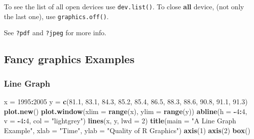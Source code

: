 \documentclass[]{book}
\newenvironment{Shaded}{\begin{snugshade}}{\end{snugshade}}
\newcommand{\KeywordTok}[1]{\textcolor[rgb]{0.13,0.29,0.53}{\textbf{#1}}}
\newcommand{\DataTypeTok}[1]{\textcolor[rgb]{0.13,0.29,0.53}{#1}}
\newcommand{\DecValTok}[1]{\textcolor[rgb]{0.00,0.00,0.81}{#1}}
\newcommand{\FloatTok}[1]{\textcolor[rgb]{0.00,0.00,0.81}{#1}}
\newcommand{\StringTok}[1]{\textcolor[rgb]{0.31,0.60,0.02}{#1}}
\newcommand{\CommentTok}[1]{\textcolor[rgb]{0.56,0.35,0.01}{\textit{#1}}}
\newcommand{\OperatorTok}[1]{\textcolor[rgb]{0.81,0.36,0.00}{\textbf{#1}}}
\newcommand{\NormalTok}[1]{#1}
\theoremstyle{definition}
\theoremstyle{definition}
\theoremstyle{definition}
\theoremstyle{remark}
\begin{document}
\begin{Shaded}
\end{Shaded}

To see the list of all open devices use \texttt{dev.list()}. To close
\textbf{all} device, (not only the last one), use
\texttt{graphics.off()}.

See \texttt{?pdf} and \texttt{?jpeg} for more info.

\subsection{Fancy graphics Examples}\label{fancy}

\subsubsection{Line Graph}\label{line-graph}

\begin{Shaded}
\begin{Highlighting}[]
\NormalTok{x =}\StringTok{ }\DecValTok{1995}\OperatorTok{:}\DecValTok{2005}
\NormalTok{y =}\StringTok{ }\KeywordTok{c}\NormalTok{(}\FloatTok{81.1}\NormalTok{, }\FloatTok{83.1}\NormalTok{, }\FloatTok{84.3}\NormalTok{, }\FloatTok{85.2}\NormalTok{, }\FloatTok{85.4}\NormalTok{, }\FloatTok{86.5}\NormalTok{, }\FloatTok{88.3}\NormalTok{, }\FloatTok{88.6}\NormalTok{, }\FloatTok{90.8}\NormalTok{, }\FloatTok{91.1}\NormalTok{, }\FloatTok{91.3}\NormalTok{)}
\KeywordTok{plot.new}\NormalTok{()}
\KeywordTok{plot.window}\NormalTok{(}\DataTypeTok{xlim =} \KeywordTok{range}\NormalTok{(x), }\DataTypeTok{ylim =} \KeywordTok{range}\NormalTok{(y))}
\KeywordTok{abline}\NormalTok{(}\DataTypeTok{h =} \OperatorTok{-}\DecValTok{4}\OperatorTok{:}\DecValTok{4}\NormalTok{, }\DataTypeTok{v =} \OperatorTok{-}\DecValTok{4}\OperatorTok{:}\DecValTok{4}\NormalTok{, }\DataTypeTok{col =} \StringTok{"lightgrey"}\NormalTok{)}
\KeywordTok{lines}\NormalTok{(x, y, }\DataTypeTok{lwd =} \DecValTok{2}\NormalTok{)}
\KeywordTok{title}\NormalTok{(}\DataTypeTok{main =} \StringTok{"A Line Graph Example"}\NormalTok{,}
        \DataTypeTok{xlab =} \StringTok{"Time"}\NormalTok{,}
        \DataTypeTok{ylab =} \StringTok{"Quality of R Graphics"}\NormalTok{)}
\KeywordTok{axis}\NormalTok{(}\DecValTok{1}\NormalTok{)}
\KeywordTok{axis}\NormalTok{(}\DecValTok{2}\NormalTok{)}
\KeywordTok{box}\NormalTok{()}
\end{Highlighting}
\end{Shaded}
\end{document}
